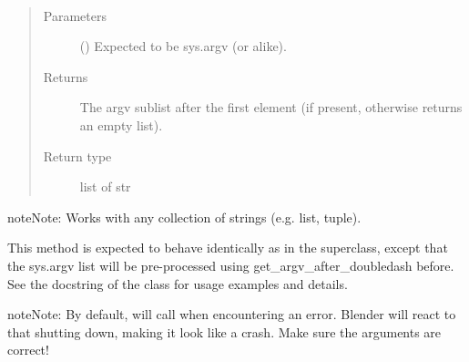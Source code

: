 \documentclass[letterpaper,10pt,english,openany,oneside]{sphinxmanual}
\begin{document}
\begin{fulllineitems}
\begin{fulllineitems}
\label{\detokenize{io_anim_mvnx:io_anim_mvnx.utils.ArgumentParserForBlender.get_argv_after_doubledash}}~\begin{quote}\begin{description}
\item[{Parameters}] \leavevmode
{} () \textendash{} Expected to be sys.argv (or alike).

\item[{Returns}] \leavevmode
The argv sublist after the first  element (if
present, otherwise returns an empty list).

\item[{Return type}] \leavevmode
list of str

\end{description}\end{quote}

\begin{sphinxadmonition}{note}{Note:}
Works with any  collection of strings (e.g. list, tuple).
\end{sphinxadmonition}

\end{fulllineitems}


\begin{fulllineitems}
\label{\detokenize{io_anim_mvnx:io_anim_mvnx.utils.ArgumentParserForBlender.parse_args}}
This method is expected to behave identically as in the superclass,
except that the sys.argv list will be pre-processed using
get\_argv\_after\_doubledash before. See the docstring of the class for
usage examples and details.

\begin{sphinxadmonition}{note}{Note:}
By default,  will call  when
encountering an error. Blender will react to that shutting down,
making it look like a crash. Make sure the arguments are correct!
\end{sphinxadmonition}

\end{fulllineitems}


\end{fulllineitems}
\end{document}
